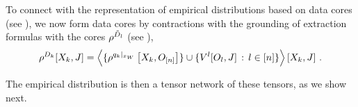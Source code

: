 To connect with the representation of empirical distributions based on data cores (see ), we now form data cores by contractions with the grounding of extraction formulas with the cores $\rho^{\tilde{D}_{l}}$ (see ),
\begin{align*}
    \rho^{D_{k}}[X_{k},J]
    = \left\langle 
        \{\rho^{{q_{k}}|_{x_{W}}}\left[X_{k},O_{[n]}\right]\}
        \cup \{ V^{l}[O_{l},J] \, : \, l\in[n]\}
    \right\rangle \left[ X_{k},J \right] \, .
\end{align*}

The empirical distribution is then a tensor network of these tensors, as we show next.

